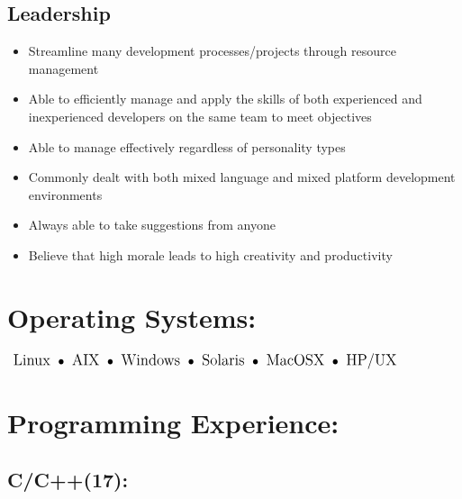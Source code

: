\documentclass[10pt]{report}
\begin{document}
\subsection*{Leadership}
\begin{itemize}
	\item Streamline many development processes/projects through resource management
	\item Able to efficiently manage and apply the skills of both experienced and inexperienced developers on the same team to meet objectives
	\item Able to manage effectively regardless of personality types
	\item Commonly dealt with both mixed language and mixed platform development environments
	\item Always able to take suggestions from anyone
	\item Believe that high morale leads to high creativity and productivity
\end{itemize}


\section*{Operating Systems:}

\begin{math}
\large
\textrm{ Linux }
\bullet \space \textrm{ AIX } \space
\bullet \space \textrm{ Windows } \space
\bullet \space \textrm{ Solaris } \space
\bullet \space \textrm{ MacOSX } \space
\bullet \space \textrm{ HP/UX }
\end{math}

\pagebreak

\section*{Programming Experience:}

\subsection*{C/C++(17):}
\end{document}

